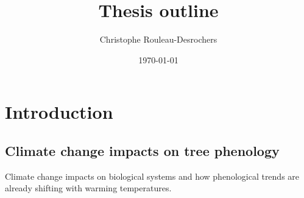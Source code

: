 \documentclass{article}
\title{Thesis outline}
\date{\today}
\author{Christophe Rouleau-Desrochers}
\begin{document}

\maketitle


\section*{Introduction}

\subsection*{Climate change impacts on tree phenology} 
Climate change impacts on biological systems and how phenological trends are already shifting with warming temperatures. 
\end{document}
